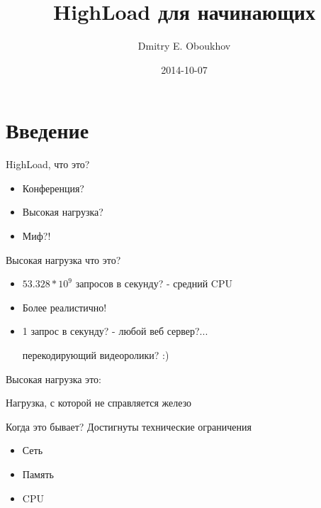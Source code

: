 \documentclass[aspectratio=169]{beamer}
\title{HighLoad для начинающих}
\author{Dmitry E. Oboukhov}
\date{2014-10-07}
\begin{document}
\maketitle

\begin{frame}
    \tableofcontents
\end{frame}

\section{Введение}
\begin{frame}{HighLoad, что это?}
    \begin{itemize}

        \item Конференция?
        
        \pause
        \item Высокая нагрузка?

        \pause
        \item Миф?!
    
    \end{itemize}
\end{frame}

\begin{frame}{Высокая нагрузка что это?}
    \begin{itemize}
        
        \pause
        \item $53.328 * 10^9$  запросов в секунду?
            \pause
            {\small - средний CPU}

        \pause
        \item Более реалистично!

        \pause
        \item 1 запрос в секунду?
            \pause
            - любой веб сервер?...
            \pause
            \par {\small перекодирующий видеоролики? :)}
    \end{itemize}
\end{frame}

\begin{frame}{Высокая нагрузка это:}
    \pause
    \begin{center}
        {\huge Нагрузка, с которой не справляется железо}
    \end{center}
\end{frame}

\begin{frame}{Когда это бывает?}
    \pause
    {\large Достигнуты технические ограничения}
    \begin{itemize}
        \pause
        \item Сеть
        
        \pause
        \item Память
        
        \pause
        \item CPU
    \end{itemize}
\end{frame}
\end{document}
